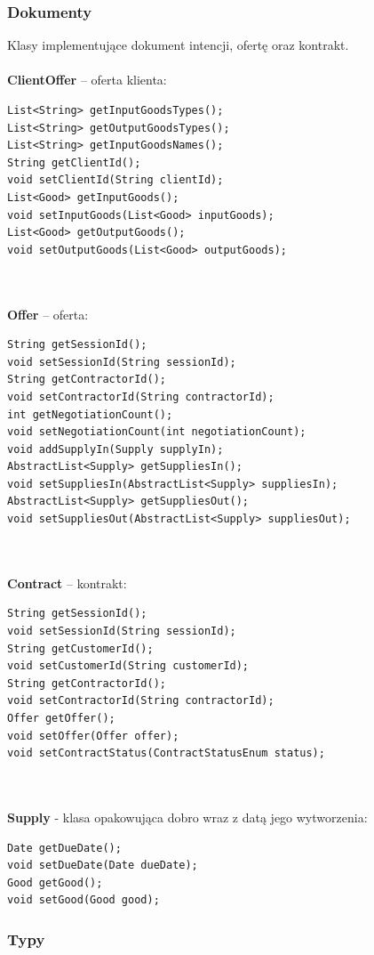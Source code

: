 \documentclass[a4paper,12pt]{article}
\begin{document}
\subsubsection{Dokumenty}

Klasy implementujące dokument intencji, ofertę oraz kontrakt.
\\ \\
\textbf{ClientOffer} – oferta klienta:
\begin{lstlisting}
List<String> getInputGoodsTypes();
List<String> getOutputGoodsTypes();
List<String> getInputGoodsNames();
String getClientId();
void setClientId(String clientId);
List<Good> getInputGoods();
void setInputGoods(List<Good> inputGoods);
List<Good> getOutputGoods();
void setOutputGoods(List<Good> outputGoods);
\end{lstlisting}
\\ \\
\textbf{Offer} – oferta:
\begin{lstlisting}
String getSessionId();
void setSessionId(String sessionId);
String getContractorId();
void setContractorId(String contractorId);
int getNegotiationCount();
void setNegotiationCount(int negotiationCount);
void addSupplyIn(Supply supplyIn);
AbstractList<Supply> getSuppliesIn();
void setSuppliesIn(AbstractList<Supply> suppliesIn);
AbstractList<Supply> getSuppliesOut();
void setSuppliesOut(AbstractList<Supply> suppliesOut);
\end{lstlisting}
\\ \\
\textbf{Contract} – kontrakt:
\begin{lstlisting}
String getSessionId();
void setSessionId(String sessionId);
String getCustomerId();
void setCustomerId(String customerId);
String getContractorId();
void setContractorId(String contractorId);
Offer getOffer();
void setOffer(Offer offer);
void setContractStatus(ContractStatusEnum status);
\end{lstlisting}
\\ \\
\textbf{Supply} - klasa opakowująca dobro wraz z datą jego wytworzenia:
\begin{lstlisting}
Date getDueDate();
void setDueDate(Date dueDate);
Good getGood();
void setGood(Good good);
\end{lstlisting}

\subsubsection{Typy}
\end{document}
